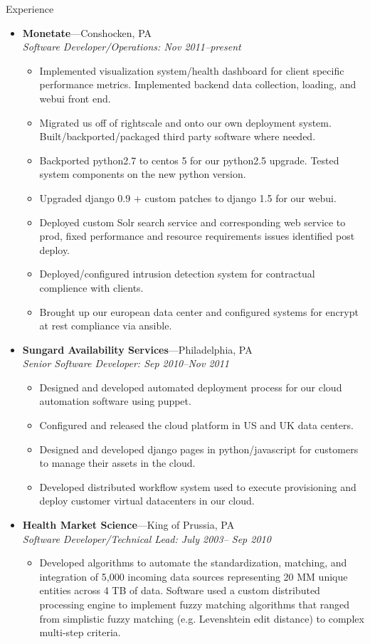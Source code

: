\documentclass[11pt,oneside]{article}
\newenvironment{ressection}[1]{
        \vspace{4pt}
        {\fontfamily{phv}\selectfont\Large#1}
        \begin{itemize}
        \vspace{3pt}
}{
        \end{itemize}
}
\newcommand{\ressubitem}[1]{
        \vspace{-1pt}
        \item \begin{flushleft} #1 \end{flushleft}
}
\newcommand{\resbigitem}[3]{
        \vspace{-5pt}
        \item
        \textbf{#1}---#2 \\
        \textit{#3}
}
\newenvironment{ressubsec}[3]{
        \resbigitem{#1}{#2}{#3}
        \vspace{-2pt}
        \begin{itemize}
}{
        \end{itemize}
}
\begin{document}
\begin{ressection}{Experience}
        
        \begin{ressubsec}{Monetate}{Conshocken, PA}{Software Developer/Operations: Nov 2011--present}

          \ressubitem{Implemented visualization system/health dashboard for client specific performance metrics. Implemented backend data collection, loading, and webui front end. }
          \ressubitem{Migrated us off of rightscale and onto our own deployment system. Built/backported/packaged third party software where needed. }
          \ressubitem{Backported python2.7 to centos 5 for our python2.5 upgrade. Tested system components on the new python version.}
          \ressubitem{Upgraded django 0.9 + custom patches to django 1.5 for our webui.}
          \ressubitem{Deployed custom Solr search service and corresponding web service to prod, fixed performance and resource requirements issues identified post deploy.}
          \ressubitem{Deployed/configured intrusion detection system for contractual complience with clients. }
          \ressubitem{Brought up our european data center and configured systems for encrypt at rest compliance via ansible. }
        \end{ressubsec}


        \begin{ressubsec}{Sungard Availability Services}{Philadelphia, PA}{Senior Software Developer: Sep 2010--Nov 2011}

          \ressubitem{Designed and developed automated deployment process for our cloud automation software using puppet. }
          \ressubitem{Configured and released the cloud platform in US and UK data centers. }
          \ressubitem{Designed and developed django pages in python/javascript for customers to manage their assets in the cloud. }
          \ressubitem{Developed distributed workflow system used to execute provisioning and deploy customer virtual datacenters in our cloud. }
        \end{ressubsec}

        \begin{ressubsec}{Health Market Science}{King of Prussia, PA}{Software Developer/Technical Lead: July 2003-- Sep 2010}

          \ressubitem{Developed algorithms to automate the
            standardization, matching, and integration of 5,000
            incoming data sources representing 20 MM unique entities
            across 4 TB of data.  Software used a custom distributed
            processing engine to implement fuzzy matching algorithms
            that ranged from simplistic fuzzy matching
            (e.g. Levenshtein edit distance) to complex multi-step
            criteria. }


\end{ressubsec}
\end{ressection}
\end{document}
